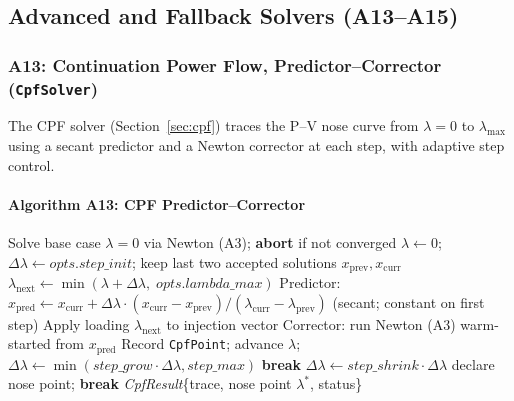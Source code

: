 \subsection{Advanced and Fallback Solvers (A13--A15)}
\label{sec:algo-fallback}

\subsubsection{A13: Continuation Power Flow, Predictor--Corrector (\texttt{CpfSolver})}
\label{algo:a13}

The CPF solver (Section~\ref{sec:cpf}) traces the P--V nose curve from
$\lambda=0$ to $\lambda_{\max}$ using a secant predictor and a Newton
corrector at each step, with adaptive step control.

\paragraph{Algorithm A13: CPF Predictor--Corrector}
\begin{algorithmic}[1]
  \State Solve base case $\lambda=0$ via Newton (A3); \textbf{abort} if not converged
  \State $\lambda \gets 0$;\quad $\Delta\lambda \gets \mathit{opts.step\_init}$;\quad
    keep last two accepted solutions $x_{\mathrm{prev}}, x_\mathrm{curr}$
    \State $\lambda_{\mathrm{next}} \gets \min(\lambda + \Delta\lambda,\;\mathit{opts.lambda\_max})$
    \State Predictor: $x_{\mathrm{pred}} \gets x_\mathrm{curr} + \Delta\lambda \cdot
      (x_\mathrm{curr}-x_\mathrm{prev})/(\lambda_\mathrm{curr}-\lambda_\mathrm{prev})$
      (secant; constant on first step)
    \State Apply loading $\lambda_{\mathrm{next}}$ to injection vector
    \State Corrector: run Newton (A3) warm-started from $x_{\mathrm{pred}}$
      \State Record \texttt{CpfPoint}; advance $\lambda$;
        $\Delta\lambda \gets \min(\mathit{step\_grow}\cdot\Delta\lambda, \mathit{step\_max})$
        \textbf{break}
      \EndIf
    \Else
      \State $\Delta\lambda \gets \mathit{step\_shrink}\cdot\Delta\lambda$
       declare nose point; \textbf{break} \EndIf
    \EndIf
  \EndFor
  \State \Return \textit{CpfResult}\{trace, nose point $\lambda^*$, status\}
\EndProcedure
\end{algorithmic}

